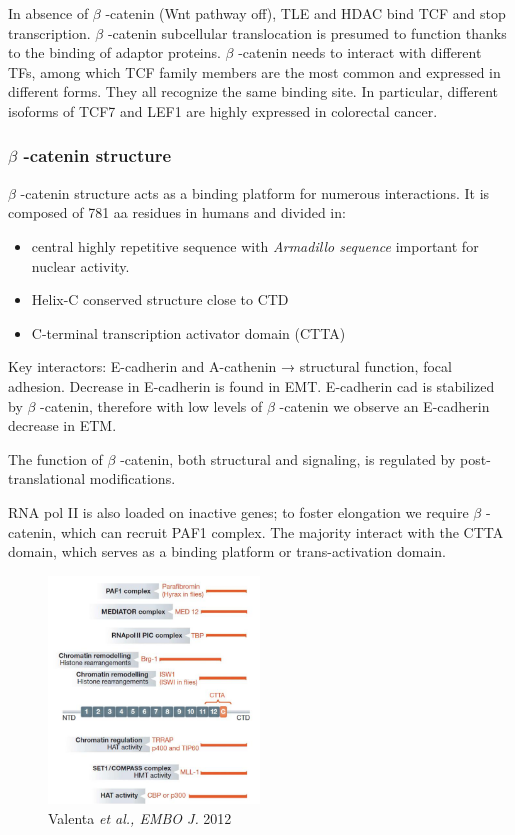 In absence of $\beta$  -catenin (Wnt pathway off), TLE and HDAC bind TCF and stop transcription. $\beta$  -catenin subcellular translocation is presumed to function thanks to the binding of adaptor proteins. $\beta$  -catenin needs to interact with different TFs, among which TCF family members are the most common and expressed in different forms. They all recognize the same binding site. In particular, different isoforms of TCF7 and LEF1 are highly expressed in colorectal cancer.

\hypertarget{ux3b2-catenin-structure}{%
\subsubsection{$\beta$  -catenin structure}\label{ux3b2-catenin-structure}}

$\beta$  -catenin structure acts as a binding platform for numerous interactions. It is composed of 781 aa residues in humans and divided in:

\begin{itemize}
\tightlist
\item
  central highly repetitive sequence with \emph{Armadillo sequence} important for nuclear activity.
\item
  Helix-C conserved structure close to CTD
\item
  C-terminal transcription activator domain (CTTA)
\end{itemize}

Key interactors: E-cadherin and A-cathenin → structural function, focal adhesion. Decrease in E-cadherin is found in EMT. E-cadherin cad is stabilized by $\beta$  -catenin, therefore with low levels of $\beta$  -catenin we observe an E-cadherin decrease in ETM.

The function of $\beta$  -catenin, both structural and signaling, is regulated by post-translational modifications.

RNA pol II is also loaded on inactive genes; to foster elongation we require $\beta$  -catenin, which can recruit PAF1 complex. The majority interact with the CTTA domain, which serves as a binding platform or trans-activation domain.

\begin{figure}
\centering
\includegraphics[width=0.5\textwidth]{../_resources/Screenshot_2022-10-07_at_11-52-13.png}
\caption{Valenta \emph{et al., EMBO J.} 2012}
\end{figure}

